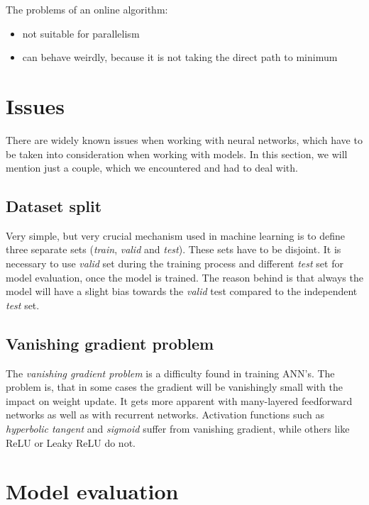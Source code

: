 \noindent
The problems of an online algorithm:

\begin{itemize}

\item not suitable for parallelism
\item can behave weirdly, because it is not taking the direct path to minimum

\end{itemize}

\section{Issues}

There are widely known issues when working with neural networks, which have to be taken into consideration when working with models. In this section, we will mention just a couple, which we encountered and had to deal with.

\subsection{Dataset split}

Very simple, but very crucial mechanism used in machine learning is to define three separate sets (\textit{train}, \textit{valid} and \textit{test}). These sets have to be disjoint. It is necessary to use \textit{valid} set during the training process and different \textit{test} set for model evaluation, once the model is trained. The reason behind is that always the model will have a slight bias towards the \textit{valid} test compared to the independent \textit{test} set.

\subsection{Vanishing gradient problem}

\label{vanishing_gradient}

The \textit{vanishing gradient problem} \cite{vanishing_gradient} is a difficulty found in training ANN's. The problem is, that in some cases the gradient will be vanishingly small with the impact on weight update. It gets more apparent with many-layered feedforward networks as well as with recurrent networks. Activation functions such as \textit{hyperbolic tangent} and \textit{sigmoid} suffer from vanishing gradient, while others like ReLU or Leaky ReLU do not.

\section{Model evaluation}
\label{nn-metrics}

